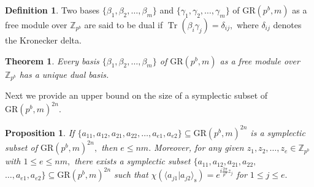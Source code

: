 \documentclass{article}
\DeclareMathOperator{\Tr}{Tr}
\newtheorem{thm}{Theorem}[section]
\newtheorem{prop}{Proposition}[section]
\theoremstyle{remark}
\theoremstyle{definition}
\newtheorem{defin}{Definition}[section]
\numberwithin{equation}{section}
\begin{document}
\begin{defin}\cite{sison} Two bases $\{\beta_1,\beta_2,\ldots,\beta_m\}$ and  $\{\gamma_1,\gamma_2,\ldots,\gamma_m\}$ of $\text{GR}(p^b,m)$ as a free module over $\mathbb{Z}_{p^b}$ are said to be dual if ${\Tr}(\beta_i\gamma_j)=\delta_{ij},$ where $\delta_{ij}$ denotes the Kronecker delta.\end{defin}
\begin{thm}\cite{sison} Every basis $\{\beta_1,\beta_2,\ldots,\beta_m\}$  of $\text{GR}(p^b,m)$ as a free module over $\mathbb{Z}_{p^b}$ has a unique dual basis.
\end{thm}

 Next we provide an upper bound on the size of a symplectic subset of $\text{GR}(p^b,m)^{2n}.$
\begin{prop}\label{prop:symGR}  If $\{a_{11},a_{12},a_{21},a_{22},\ldots,a_{e1},a_{e2}\} \subseteq \text{GR}(p^b,m)^{2n}$ is a symplectic subset of $\text{GR}(p^b,m)^{2n},$ then $e \leq nm.$ Moreover, for any given $z_1,z_2,\ldots,z_e \in \mathbb{Z}_{p^b}$ with $1 \leq e \leq nm,$ there exists a symplectic subset $\{a_{11},a_{12},a_{21},a_{22},$ $\ldots,a_{e1},a_{e2}\} \subseteq \text{GR}(p^b,m)^{2n}$ such that $ \chi(\langle a_{j1} |  a_{j2}\rangle_{\mathrm{s}})= e^{i \frac{2\pi }{p^b} z_j  }$ for $1\leq j \leq e.$
\end{prop}
\end{document}
